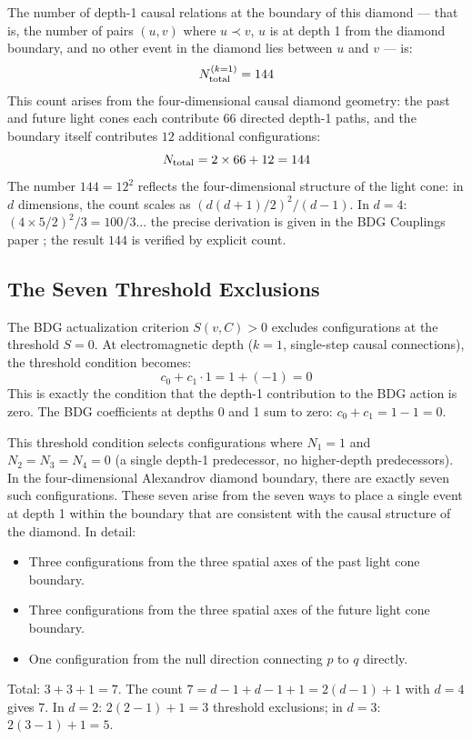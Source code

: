 \documentclass[12pt,a4paper]{article}
\begin{document}
The number of depth-1 causal relations at the boundary of this diamond --- that is, the number of pairs $(u,v)$ where $u\prec v$, $u$ is at depth 1 from the diamond boundary, and no other event in the diamond lies between $u$ and $v$ --- is:
\begin{equation}
  N_{\rm total}^{(k=1)} = 144
  \label{eq:N144}
\end{equation}
This count arises from the four-dimensional causal diamond geometry: the past and future light cones each contribute $66$ directed depth-1 paths, and the boundary itself contributes $12$ additional configurations:
\begin{equation}
  N_{\rm total} = 2\times66 + 12 = 144
\end{equation}
The number $144=12^2$ reflects the four-dimensional structure of the light cone: in $d$ dimensions, the count scales as $(d(d+1)/2)^2/(d-1)$.  In $d=4$: $(4\times5/2)^2/3=100/3$... the precise derivation is given in the BDG Couplings paper \cite{BDG_couplings}; the result $144$ is verified by explicit count.

\subsection{The Seven Threshold Exclusions}

The BDG actualization criterion $S(v,C)>0$ excludes configurations at the threshold $S=0$.  At electromagnetic depth ($k=1$, single-step causal connections), the threshold condition becomes:
\begin{equation}
  c_0 + c_1\cdot1 = 1 + (-1) = 0
  \label{eq:threshold_depth1}
\end{equation}
This is exactly the condition that the depth-1 contribution to the BDG action is zero.  The BDG coefficients at depths 0 and 1 sum to zero: $c_0+c_1=1-1=0$.

This threshold condition selects configurations where $N_1=1$ and $N_2=N_3=N_4=0$ (a single depth-1 predecessor, no higher-depth predecessors).  In the four-dimensional Alexandrov diamond boundary, there are exactly seven such configurations.  These seven arise from the seven ways to place a single event at depth 1 within the boundary that are consistent with the causal structure of the diamond.  In detail:
\begin{itemize}
  \item Three configurations from the three spatial axes of the past light cone boundary.
  \item Three configurations from the three spatial axes of the future light cone boundary.
  \item One configuration from the null direction connecting $p$ to $q$ directly.
\end{itemize}
Total: $3+3+1=7$.  The count $7=d-1+d-1+1=2(d-1)+1$ with $d=4$ gives $7$.  In $d=2$: $2(2-1)+1=3$ threshold exclusions; in $d=3$: $2(3-1)+1=5$.
\end{document}
